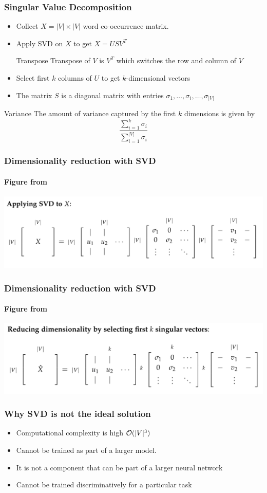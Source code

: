 \begin{frame}
\frametitle{Singular Value Decomposition}
\begin{itemize}[<+->]
\item Collect $X = |V| \times |V|$ word co-occurrence matrix.
\item Apply SVD on $X$ to get $X = U S V^T$
\pause
\begin{block}{Transpose}
Transpose of $V$ is $V^T$ which switches the row and column of $V$
\end{block}
\item Select first $k$ columns of $U$ to get $k$-dimensional vectors
\item The matrix $S$ is a diagonal matrix with entries $\sigma_1, \ldots, \sigma_i, \ldots, \sigma_{|V|}$
\end{itemize}
\pause 
\begin{alertblock}{Variance}
The amount of variance captured by the first $k$ dimensions is given by
\[ \frac{\sum_{i=1}^k \sigma_i}{\sum_{i=1}^{|V|} \sigma_i} \]\end{alertblock}
\end{frame}

\begin{frame}
\frametitle{Dimensionality reduction with SVD}
\framesubtitle{Figure from \cite{cs224n}}
\centering
\includegraphics[scale=.35]{figures/wordvectors/svdapply}
\end{frame}

\begin{frame}
\frametitle{Dimensionality reduction with SVD}
\framesubtitle{Figure from \cite{cs224n}}
\centering
\includegraphics[scale=.38]{figures/wordvectors/reducedim}
\end{frame}

\begin{frame}
\frametitle{Why SVD is not the ideal solution}
\begin{itemize}[<+->]
	\item Computational complexity is high ${\cal O}(|V|^3)$
	\item Cannot be trained as part of a larger model. 
	\item It is not a component that can be part of a larger neural network
	\item Cannot be trained discriminatively for a particular task
\end{itemize}
\end{frame}


